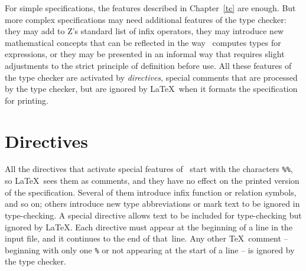 For simple specifications, the features described in
Chapter~\ref{tc} are enough.  But more complex specifications may
need additional features of the type checker: they may add to Z's
standard list of infix operators, they may introduce new
mathematical concepts that can be reflected in the way \fuzz\
computes types for expressions, or they may be presented in an
informal way that requires slight adjustments to the strict
principle of definition before use.  All these features of
the type checker are activated by {\em directives}, special
comments that are processed by the type checker, but are ignored by
\LaTeX\ when it formats the specification for printing.

\section{Directives}\label{directives}

All the directives that activate special features
of \fuzz\ start with the characters \verb/%%/, so \LaTeX\ sees them
as comments, and they have no effect on the printed version of the
specification.  Several of them introduce infix function or relation
symbols, and so on; others introduce new type abbreviations or mark
text to be ignored in type-checking.  A special directive allows
text to be included for type-checking but ignored by \LaTeX. Each
directive must appear at the beginning of a line in the input file,
and it continues to the end of that~line. Any other \TeX\
comment --
beginning with only one \verb/%/ or not appearing at the start of a
line -- is ignored by the type checker.

